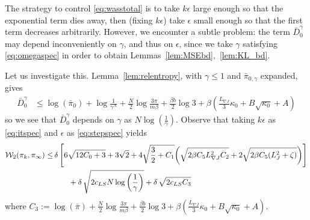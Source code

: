 \documentclass[journal,onecolumn]{IEEEtran}
\newcommand{\step}{\epsilon}
\newcommand{\grad}{\nabla}
\newcommand{\rew}{J}
\newcommand{\reals}{\mathbb{R}}
\newcommand{\dimn}{N}
\newcommand{\kn}{\kappa_0}
\newcommand{\knw}{\kn^{\idw}}
\newcommand{\wass}{\mathcal{W}_2}
\newcommand{\KL}{D}
\newcommand{\gibbs}{\ids_{\infty}}
\newcommand{\dtlaw}{\ids_{k}} %
\newcommand{\LSconst}{c_{LS}}
\newcommand{\ids}{\pi}
\newcommand{\idistmax}{\bar{\ids}_0}
\newcommand{\idw}{\gamma}
\newcommand{\isp}{0,\idw}
\newcommand{\ksp}{k,\idw}
\newcommand{\idistmaxw}{\bar{\ids}_{\isp}}
\newcommand{\relentbd}{\bar{\KL}_0}
\newcommand{\relentbdw}{\relentbd^{\idw}}
\newcommand{\constA}{A}
\newcommand{\constB}{B}
\newcommand{\dissm}{m}
\newcommand{\dissb}{b}
\newcommand{\gradnvar}{\zeta}
\newcommand{\lipJ}{L_J}
\newcommand{\lipGJ}{L_{\grad\rew}}
\begin{document}
{The strategy to control \eqref{eq:wasstotal} is to take $k\step$ large enough so that the exponential term dies away, then (fixing $k\step$) take $\step$ small enough so that the first term decreases arbitrarily. However, we encounter a subtle problem: the term $\relentbdw$ may depend inconveniently on $\idw$, and thus on $\step$, since we take $\idw$ satisfying \eqref{eq:omegaspec} in order to obtain Lemmas~\ref{lem:MSEbd},~\ref{lem:KL_bd}.

Let us investigate this. Lemma~\ref{lem:relentropy}, with
$\idw \leq 1$ and $\idistmaxw$ expanded, gives
\begin{align*}
    \relentbdw %
    & \leq \log(\idistmax) + \log\frac{1}{\idw^{\dimn}} +  \frac{\dimn}{2} \log\frac{3\pi}{\dissm\beta} + \frac{\beta \dissb}{2}\log3 + \beta\left(\frac{\lipGJ}{3}\kn + \constB\sqrt{\kn} + \constA\right)
\end{align*}
so we see that $\relentbdw$ depends on $\idw$ as $\dimn\log\left(\frac{1}{\idw}\right)$. Observe that taking $k\step$ as \eqref{eq:itspec} and $\step$ as \eqref{eq:stepspec} yields 
\begin{gather}
\begin{aligned}
\begin{split}
    \wass(\dtlaw,\gibbs) \leq &\,\delta\left[6\sqrt{12C_0 + 3} + 3\sqrt{2} + 4\sqrt{\frac{3}{2} + C_1 }{\color{black}\left(\sqrt{2\beta C_5 \lipGJ^2 C_2} + 2\sqrt{2\beta C_5(\lipJ^2 + \gradnvar)} \right)}\right] \\
    &\quad \quad+ \delta\,\sqrt{2\LSconst \dimn\log\left(\frac{1}{\idw}\right)} + \delta\, \sqrt{2\LSconst C_3}
\end{split}
\end{aligned}\raisetag{-3\baselineskip}
\end{gather}
where $C_3 := \log(\bar{\pi}) + \frac{\dimn}{2} \log\frac{3\pi}{\dissm\beta} + \frac{\beta \dissb}{2}\log3 + \beta\left(\frac{\lipGJ}{3}\kn + \constB\sqrt{\kn} + \constA\right)$.
}
\end{document}

